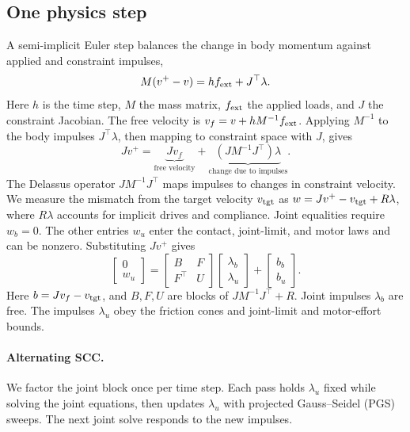 \documentclass[conference]{IEEEtran}
\begin{document}
\subsection{One physics step}
A semi-implicit Euler step balances the change in body momentum against applied and constraint impulses,
\[
M(v^+-v)=h f_{\rm ext}+J^\top\lambda .
\]
Here \(h\) is the time step, \(M\) the mass matrix, \(f_{\rm ext}\) the applied loads, and \(J\) the constraint Jacobian. The free velocity is \(v_f=v+hM^{-1}f_{\rm ext}\). Applying \(M^{-1}\) to the body impulses \(J^\top\lambda\), then mapping to constraint space with \(J\), gives
\[
Jv^+ = \underbrace{Jv_f}_{\text{free velocity}}
    + \underbrace{(JM^{-1}J^\top)\lambda}_{\text{change due to impulses}} .
\]
The Delassus operator \(JM^{-1}J^\top\) maps impulses to changes in constraint velocity. We measure the mismatch from the target velocity \(v_{\rm tgt}\) as \(w=Jv^+-v_{\rm tgt}+R\lambda\), where \(R\lambda\) accounts for implicit drives and compliance. Joint equalities require \(w_b=0\). The other entries \(w_u\) enter the contact, joint-limit, and motor laws and can be nonzero. Substituting \(Jv^+\) gives
\begin{equation}
\begin{bmatrix}0\\w_u\end{bmatrix} =
\begin{bmatrix}B&F\\F^\top&U\end{bmatrix}
\begin{bmatrix}\lambda_b\\\lambda_u\end{bmatrix}+
\begin{bmatrix}b_b\\b_u\end{bmatrix}.
\label{eq:blocks}
\end{equation}
Here \(b=Jv_f-v_{\rm tgt}\), and \(B,F,U\) are blocks of \(JM^{-1}J^\top+R\). Joint impulses \(\lambda_b\) are free. The impulses \(\lambda_u\) obey the friction cones and joint-limit and motor-effort bounds.

\paragraph{Alternating SCC.} We factor the joint block once per time step. Each pass holds \(\lambda_u\) fixed while solving the joint equations, then updates \(\lambda_u\) with projected Gauss--Seidel (PGS) sweeps. The next joint solve responds to the new impulses.
\end{document}
